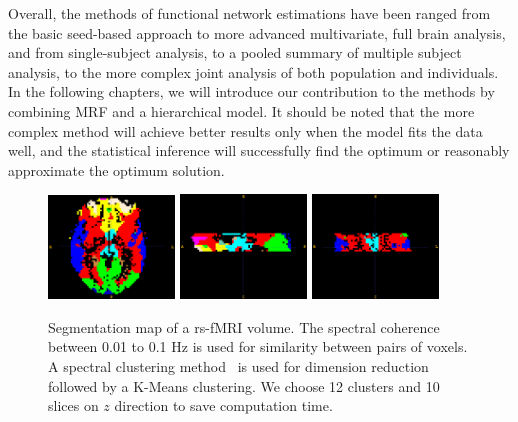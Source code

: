 Overall, the methods of functional network estimations have been ranged from the
basic seed-based approach to more advanced multivariate, full brain analysis,
and from single-subject analysis, to a pooled summary of multiple subject
analysis, to the more complex joint analysis of both population and
individuals. In the following chapters, we will introduce our contribution to the
methods by combining MRF and a hierarchical model. It should be noted that the
more complex method will achieve better results only when the model fits the
data well, and the statistical inference will successfully find the optimum or
reasonably approximate the optimum solution.



\begin{figure}[p]
  \centering
  \includegraphics[width=0.3\textwidth]{figures/math/coherence/a}
  \includegraphics[width=0.3\textwidth]{figures/math/coherence/s}
  \includegraphics[width=0.3\textwidth]{figures/math/coherence/c}
  \caption{Segmentation map of a rs-fMRI volume. The spectral coherence between
    0.01 to 0.1 Hz is used for similarity between pairs of voxels. A spectral
    clustering method~\cite{von2007tutorial} is used for dimension reduction
    followed by a K-Means clustering. We choose 12 clusters and 10 slices on $z$
    direction to save computation time. }
  \label{fig:coherence}
\end{figure}

